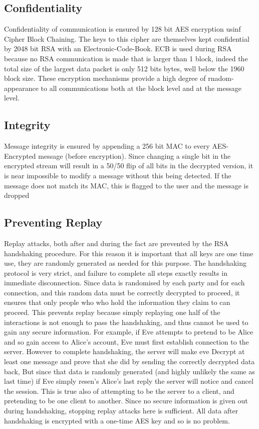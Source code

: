 \subsection{Confidentiality}
Confidentiality of communication is ensured by 128 bit AES encryption usinf Cipher Block Chaining.
The keys to this cipher are themselves kept confidential by 2048 bit RSA with an Electronic-Code-Book.
ECB is used during RSA because no RSA communication is made that is larger than 1 block, indeed the total size of the largest data packet is only 512 bits bytes, well below the 1960 block size.
These encryption mechanisms provide a high degree of rnadom-appearance to all communications both at the block level and at the message level.
\subsection{Integrity}
Message integrity is ensured by appending a 256 bit MAC to every AES-Encrypted message (before encryption).
Since changing a single bit in the encrypted stream will result in a 50/50 flip of all bits in the decrypted version, it is near impossible to modify a message without this being detected.
If the message does not match its MAC, this is flagged to the user and the message is dropped
\subsection{Preventing Replay}
Replay attacks, both after and during the fact are prevented by the RSA handshaking procedure.
For this reason it is important that all keys are one time use, they are randomly generated as needed for this purpose.
The handshaking protocol is very strict, and failure to complete all steps exactly results in immediate disconnection.
Since data is randomised by each party and for each connection, and this random data must be correctly decrypted to proceed, it ensures that only people who who hold the information they claim to can proceed.
This prevents replay because simply replaying one half of the interactions is not enough to pass the handshaking, and thus cannot be used to gain any secure information.
For example, if Eve attempts to pretend to be Alice and so gain access to Alice's account, Eve must first establish connection to the server.
However to complete handshaking, the server will make eve Decrypt at least one message and prove that she did by sending the correctly decrypted data back, But since that data is randomly generated (and highly unlikely the same as last time) if Eve simply resen's Alice's last reply the server will notice and cancel the session.
This is true also of attempting to be the server to a client, and pretending to be one client to another.
Since no secure information is given out during handshaking, stopping replay attacks here is sufficient.  All data after handshaking is encrypted with a one-time AES key and so is no problem.


